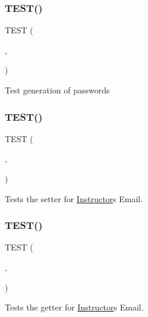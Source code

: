 \subsubsection{\texorpdfstring{T\+E\+S\+T()}{TEST()}\hspace{0.1cm}{\footnotesize\ttfamily [31/54]}}
{\footnotesize\ttfamily T\+E\+ST (\begin{DoxyParamCaption}\item[{game\+Test}]{,  }\item[{generate\+Passwords\+Test}]{ }\end{DoxyParamCaption})}

Test generation of passwords \mbox{\label{group__group2_ga9f5e8daded3608c6308588b939d435c6}} 
\subsubsection{\texorpdfstring{T\+E\+S\+T()}{TEST()}\hspace{0.1cm}{\footnotesize\ttfamily [32/54]}}
{\footnotesize\ttfamily T\+E\+ST (\begin{DoxyParamCaption}\item[{instructor\+Test}]{,  }\item[{set\+Instr\+Email\+Test}]{ }\end{DoxyParamCaption})}

Tests the setter for \hyperlink{classInstructor}{Instructor}\textquotesingle{}s Email. \mbox{\label{group__group2_gaa1ca034e04a63b41f5577be5f84ddd12}} 
\subsubsection{\texorpdfstring{T\+E\+S\+T()}{TEST()}\hspace{0.1cm}{\footnotesize\ttfamily [33/54]}}
{\footnotesize\ttfamily T\+E\+ST (\begin{DoxyParamCaption}\item[{instructor\+Test}]{,  }\item[{get\+Instr\+Email\+Test}]{ }\end{DoxyParamCaption})}

Tests the getter for \hyperlink{classInstructor}{Instructor}\textquotesingle{}s Email. \mbox{\label{group__group2_ga0f88e7e0396e122e93cc2b82b1fe6733}} 
